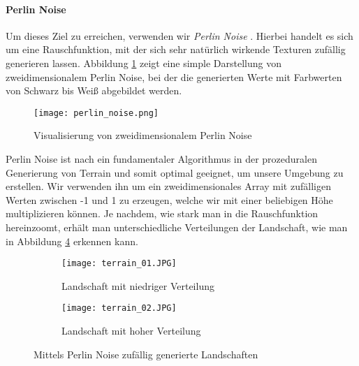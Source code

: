 \paragraph{Perlin Noise}
Um dieses Ziel zu erreichen, verwenden wir \textit{Perlin Noise} \cite{parberry2015modeling}. Hierbei handelt es sich um eine Rauschfunktion, mit der sich sehr natürlich wirkende Texturen zufällig generieren lassen. Abbildung \ref{img:perlinNoise} zeigt eine simple Darstellung von zweidimensionalem Perlin Noise, bei der die generierten Werte mit Farbwerten von Schwarz bis Weiß abgebildet werden.
\begin{figure}[h!]
    \centering
    \texttt{[image: perlin\_noise.png]}
    \caption{Visualisierung von zweidimensionalem Perlin Noise} \label{img:perlinNoise}
\end{figure}
% 
Perlin Noise ist nach \cite{parberry2015modeling} ein fundamentaler Algorithmus in der prozeduralen Generierung von Terrain und somit optimal geeignet, um unsere Umgebung zu erstellen. Wir verwenden ihn um ein zweidimensionales Array mit zufälligen Werten zwischen -1 und 1 zu erzeugen, welche wir mit einer beliebigen Höhe multiplizieren können. Je nachdem, wie stark man in die Rauschfunktion \glqq hereinzoomt\grqq{}, erhält man unterschiedliche Verteilungen der Landschaft, wie man in Abbildung \ref{img:randomTerrain} erkennen kann.
\begin{figure}[h!]
    \centering
    \begin{subfigure}[b]{0.49\textwidth}
        \texttt{[image: terrain\_01.JPG]}
        \caption{Landschaft mit niedriger Verteilung}
        \label{img:randomTerrainA}
    \end{subfigure}
    \begin{subfigure}[b]{0.49\textwidth}
        \texttt{[image: terrain\_02.JPG]}
        \caption{Landschaft mit hoher Verteilung}
        \label{img:randomTerrainB}
    \end{subfigure}
    \caption{Mittels Perlin Noise zufällig generierte Landschaften}
    \label{img:randomTerrain}
\end{figure}
